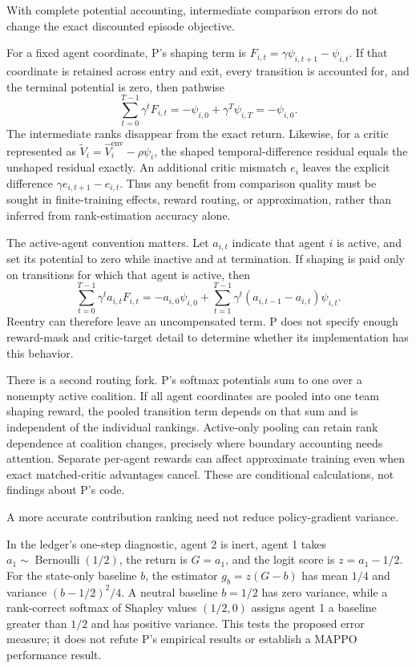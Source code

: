\documentclass{article}
\begin{document}
\begin{claim}
With complete potential accounting, intermediate comparison errors do not change the exact discounted episode objective.
\end{claim}
For a fixed agent coordinate, P's shaping term is \(F_{i,t}=\gamma\psi_{i,t+1}-\psi_{i,t}\). If that coordinate is retained across entry and exit, every transition is accounted for, and the terminal potential is zero, then pathwise
\[
\sum_{t=0}^{T-1}\gamma^t F_{i,t}
=
-\psi_{i,0}+\gamma^T\psi_{i,T}
=
-\psi_{i,0}.
\]
The intermediate ranks disappear from the exact return. Likewise, for a critic represented as
\(\widetilde V_i=\widehat V_i^{\mathrm{env}}-\rho\psi_i\), the shaped temporal-difference residual equals the unshaped residual exactly. An additional critic mismatch \(e_i\) leaves the explicit difference
\(\gamma e_{i,t+1}-e_{i,t}\). Thus any benefit from comparison quality must be sought in finite-training effects, reward routing, or approximation, rather than inferred from rank-estimation accuracy alone. 

The active-agent convention matters. Let \(a_{i,t}\) indicate that agent \(i\) is active, and set its potential to zero while inactive and at termination. If shaping is paid only on transitions for which that agent is active, then
\[
\sum_{t=0}^{T-1}\gamma^t a_{i,t}F_{i,t}
=
-a_{i,0}\psi_{i,0}
+
\sum_{t=1}^{T-1}\gamma^t
(a_{i,t-1}-a_{i,t})\psi_{i,t}.
\]
Reentry can therefore leave an uncompensated term. P does not specify enough reward-mask and critic-target detail to determine whether its implementation has this behavior. 

There is a second routing fork. P's softmax potentials sum to one over a nonempty active coalition. If all agent coordinates are pooled into one team shaping reward, the pooled transition term depends on that sum and is independent of the individual rankings. Active-only pooling can retain rank dependence at coalition changes, precisely where boundary accounting needs attention. Separate per-agent rewards can affect approximate training even when exact matched-critic advantages cancel. These are conditional calculations, not findings about P's code. 

\begin{claim}
A more accurate contribution ranking need not reduce policy-gradient variance.
\end{claim}
In the ledger's one-step diagnostic, agent 2 is inert, agent 1 takes \(a_1\sim\operatorname{Bernoulli}(1/2)\), the return is \(G=a_1\), and the logit score is \(z=a_1-1/2\). For the state-only baseline \(b\), the estimator \(g_b=z(G-b)\) has mean \(1/4\) and variance \((b-1/2)^2/4\). A neutral baseline \(b=1/2\) has zero variance, while a rank-correct softmax of Shapley values \((1/2,0)\) assigns agent 1 a baseline greater than \(1/2\) and has positive variance. This tests the proposed error measure; it does not refute P's empirical results or establish a MAPPO performance result. 
\end{document}
